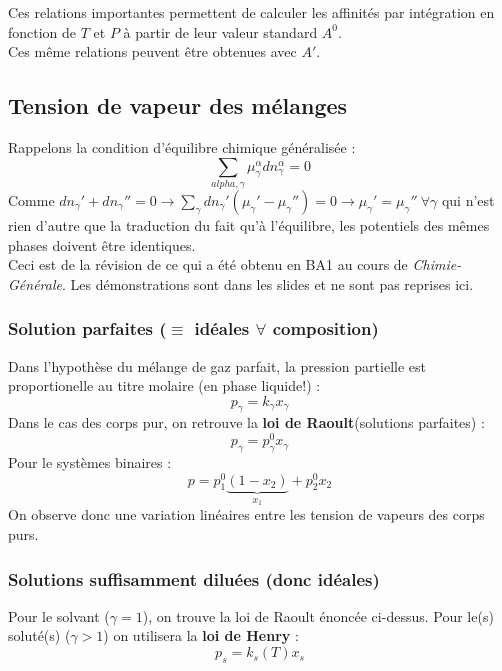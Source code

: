 \documentclass[british,french,11pt, a4paper, openany]{book}
\begin{document}
	Ces relations importantes permettent de calculer les affinités par intégration en fonction de $T$ et $P$ à partir de leur valeur standard $A^0$.\\
	
	Ces même relations peuvent être obtenues avec $A'$.
	
	
	\subsection{Tension de vapeur des mélanges}
	Rappelons la condition d'équilibre chimique généralisée :
	\begin{equation}
	\sum_{alpha, \gamma} \mu_\gamma^\alpha dn_\gamma^\alpha = 0
	\end{equation}
	Comme $dn_\gamma ' + dn_\gamma '' = 0 \rightarrow \sum_\gamma dn_\gamma ' (\mu_\gamma ' - \mu_\gamma '') = 0 \rightarrow \mu_\gamma ' = \mu_\gamma ''\ \forall \gamma$ qui n'est rien d'autre que la traduction du fait qu'à l'équilibre, les potentiels des mêmes phases doivent être identiques.\\
	
	Ceci est de la révision de ce qui a été obtenu en BA1 au cours de \textit{Chimie-Générale}. Les démonstrations sont dans les slides et ne sont pas reprises ici.
	\subsubsection{Solution parfaites ($\equiv$ idéales $\forall$ composition)}
	Dans l'hypothèse du mélange de gaz parfait, la pression partielle est proportionelle au titre molaire (en phase liquide!) :
	\begin{equation}
	p_\gamma = k_\gamma x_\gamma
	\end{equation}
	Dans le cas des corps pur, on retrouve la \textbf{loi de Raoult}(solutions parfaites) : 
	\begin{equation}
	p_\gamma = p^0_\gamma x_\gamma
	\end{equation}
	Pour le systèmes binaires : 
	\begin{equation}
	p = p^0_1\underbrace{(1-x_2)}_{x_1} + p_2^0x_2
	\end{equation}
	On observe donc une variation linéaires entre les tension de vapeurs des corps purs.
	
	\subsubsection{Solutions suffisamment diluées (donc idéales)}
	Pour le solvant ($\gamma = 1$), on trouve la loi de Raoult énoncée ci-dessus. Pour le(s) soluté(s) ($\gamma > 1$) on utilisera la \textbf{loi de Henry} :
	\begin{equation}
	p_s = k_s(T)x_s
	\end{equation}
	
\end{document}
